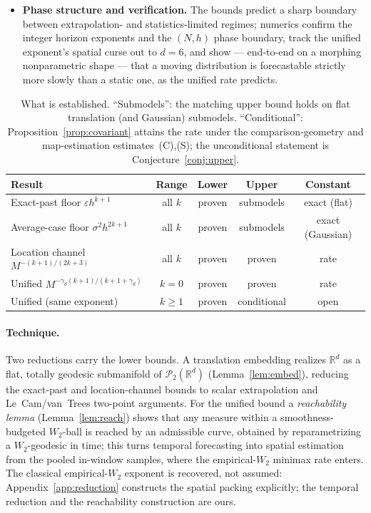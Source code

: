 \documentclass[11pt]{article}
\theoremstyle{definition}
\theoremstyle{remark}
\newcommand{\R}{\mathbb{R}}
\newcommand{\PP}{\mathcal{P}_2(\R^d)}
\begin{document}
\begin{itemize}
covariant (development-based) forecaster that attains it \emph{conditionally} on two estimates --- a
comparison-geometry bias bound and an optimal-transport map-estimation rate
(Proposition~\ref{prop:covariant}). The \emph{unconditional} matching upper bound for $k\ge1$ remains
Conjecture~\ref{conj:upper}.
\item \textbf{Phase structure and verification.} The bounds predict a sharp boundary between
extrapolation- and statistics-limited regimes; numerics confirm the integer horizon exponents and
the $(N,h)$ phase boundary, track the unified exponent's spatial curse out to $d=6$, and show ---
end-to-end on a morphing nonparametric shape --- that a moving distribution is forecastable strictly
more slowly than a static one, as the unified rate predicts.
\end{itemize}

\begin{table}[t]
\centering\small
\begin{tabular}{lcccc}
\hline
Result & Range & Lower & Upper & Constant \\
\hline
Exact-past floor $\varepsilon h^{k+1}$ & all $k$ & proven & submodels & exact (flat) \\
Average-case floor $\sigma^2 h^{2k+1}$ & all $k$ & proven & submodels & exact (Gaussian) \\
Location channel $M^{-(k+1)/(2k+3)}$ & all $k$ & proven & proven & rate \\
Unified $M^{-\gamma_d(k+1)/(k+1+\gamma_d)}$ & $k=0$ & proven & proven & rate \\
Unified (same exponent) & $k\ge1$ & proven & conditional & open \\
\hline
\end{tabular}
\caption{What is established. ``Submodels'': the matching upper bound holds on flat translation
(and Gaussian) submodels. ``Conditional'': Proposition~\ref{prop:covariant} attains the rate under
the comparison-geometry and map-estimation estimates~(C),(S); the unconditional statement is
Conjecture~\ref{conj:upper}.}
\label{tab:summary}
\end{table}

\paragraph{Technique.} Two reductions carry the lower bounds. A translation embedding realizes
$\R^d$ as a flat, totally geodesic submanifold of $\PP$ (Lemma~\ref{lem:embed}), reducing the
exact-past and location-channel bounds to scalar extrapolation and Le~Cam/van~Trees two-point
arguments. For the unified bound a \emph{reachability lemma} (Lemma~\ref{lem:reach}) shows that
any measure within a smoothness-budgeted $W_2$-ball is reached by an admissible curve, obtained by
reparametrizing a $W_2$-geodesic in time; this turns temporal forecasting into spatial estimation
from the pooled in-window samples, where the empirical-$W_2$ minimax rate enters. The classical
empirical-$W_2$ exponent is recovered, not assumed: Appendix~\ref{app:reduction} constructs the
spatial packing explicitly; the temporal reduction and the reachability construction are ours.
\end{document}
